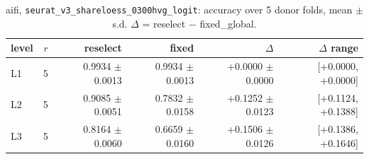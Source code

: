 \begin{table}[t]
\centering
\small
\begin{tabular}{lrrrrr}
\toprule
level & $r$ & reselect & fixed & $\Delta$ & $\Delta$ range \\
\midrule
L1 & 5 & 0.9934 $\pm$ 0.0013 & 0.9934 $\pm$ 0.0013 & +0.0000 $\pm$ 0.0000 & [+0.0000, +0.0000] \\
L2 & 5 & 0.9085 $\pm$ 0.0051 & 0.7832 $\pm$ 0.0158 & +0.1252 $\pm$ 0.0123 & [+0.1124, +0.1388] \\
L3 & 5 & 0.8164 $\pm$ 0.0060 & 0.6659 $\pm$ 0.0160 & +0.1506 $\pm$ 0.0126 & [+0.1386, +0.1646] \\
\bottomrule
\end{tabular}
\caption{aifi, \texttt{seurat\_v3\_shareloess\_0300hvg\_logit}: accuracy over 5 donor folds, mean $\pm$ s.d. $\Delta$ = reselect $-$ fixed\_global.}
\label{tab:cv-aifi-seurat-v3-shareloess-0300hvg-logit-accuracy}
\end{table}